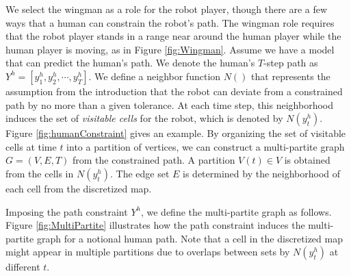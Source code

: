 \documentclass[phd]{byuprop}
\begin{document}
We select the wingman as a role for the robot player, though there are a few ways that a human can constrain the robot's path.
The wingman role requires that the robot player stands in a range near around the human player while the human player is moving, as in Figure \ref{fig:Wingman}.
Assume we have a model that can predict the human's path.
We denote the human's $T$-step path as $ Y^{h} = [y^{h}_{1}, y^{h}_{2} , \cdots , y^{h}_{T}] $.
We define a neighbor function $ N () $ that represents the assumption from the introduction that the robot can deviate from a constrained path by no more than a given tolerance.  
At each time step, this neighborhood induces the set of {\em visitable cells} for the robot, which is denoted by $ N( y^{h}_{t} ) $.
Figure \ref{fig:humanConstraint} gives an example.
By organizing the set of visitable cells at time $ t $ into a partition of vertices, we can construct a multi-partite graph $ G = (V, E, T) $ from the constrained path.
A partition $ V(t) \in V $ is obtained from the cells in $ N( y^{h}_{t} ) $.
The edge set $ E $ is determined by the neighborhood of each cell from the discretized map.

Imposing the path constraint $ Y^{h} $, we define the multi-partite graph as follows.
Figure \ref{fig:MultiPartite} illustrates how the path constraint induces the multi-partite graph for a notional human path.
Note that a cell in the discretized map might appear in multiple partitions due to overlaps between sets by $ N( y^{h}_{t} ) $ at different $ t $.
\end{document}
